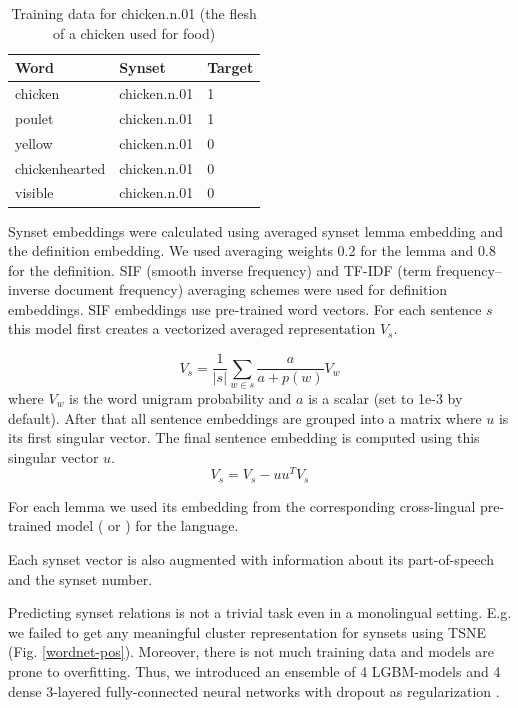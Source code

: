 \documentclass[11pt,a4paper]{article}
\begin{document}
	\begin{table}[!htbp]
	\small
	\caption{Training data for chicken.n.01 (the flesh of a chicken used for food)}
	\label{wordnet-training-data}		
	\centering
	\begin{tabular}{|l|l|l|}
		\hline
		Word & Synset & Target
		\\
		\hline
		chicken & chicken.n.01 & 1
		\\
		poulet & chicken.n.01 & 1
		\\
		yellow & chicken.n.01 & 0
		\\
		chickenhearted & chicken.n.01 & 0
		\\
		visible & chicken.n.01 & 0
		\\
		\hline
	\end{tabular}
	
\end{table}

Synset embeddings were calculated using averaged synset lemma embedding and the definition embedding. We used averaging weights 0.2 for the lemma and 0.8 for the definition. SIF (smooth inverse frequency) and TF-IDF (term frequency–inverse document frequency) averaging schemes were used for definition embeddings. SIF \cite{Arora2017} embeddings use pre-trained word vectors. For each sentence $s$ this model first creates a vectorized averaged representation $V_s$.

$$V_s = \dfrac{1}{|s|}\sum_{w \in s} \frac{a}{a + p(w)}V_w$$
where $V_w$ is the word unigram probability and $a$ is a scalar (set to 1e-3 by default).
After that all sentence embeddings are grouped into a matrix where $u$ is its first singular vector. The final sentence embedding is computed using this singular vector $u$.
$$V_s = V_s - uu^TV_s$$


For each lemma we used its embedding from the corresponding cross-lingual pre-trained model (\cite{muse} or \cite{joulin2018loss}) for the language.

Each synset vector is also augmented with information about its part-of-speech and the synset number.

Predicting synset relations is not a trivial task even in a monolingual setting. E.g. we failed to get any meaningful cluster representation for synsets using TSNE \cite{tsne} (Fig. \ref{wordnet-pos}). Moreover, there is not much training data and models are prone to overfitting. Thus, we introduced an ensemble of 4 LGBM-models \cite{lgbm} and 4 dense 3-layered fully-connected neural networks with dropout as regularization \cite{dropout} .
\end{document}
